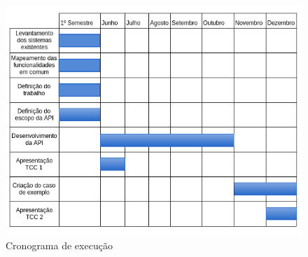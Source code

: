 \begin{figure}[h!]
\centering
\includegraphics[scale=0.8]{figuras/cronograma.png}
\caption{Cronograma de execução}
\label{fig:cronograma}
\end{figure}

